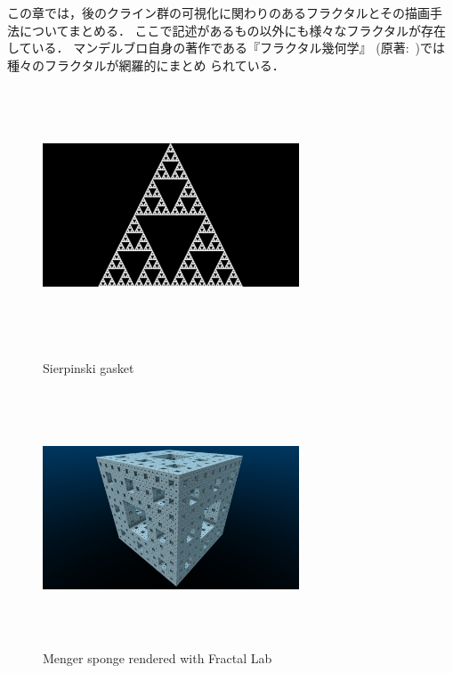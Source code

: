 この章では，後のクライン群の可視化に関わりのあるフラクタルとその描画手
法についてまとめる．
ここで記述があるもの以外にも様々なフラクタルが存在している．
マンデルブロ自身の著作である『フラクタル幾何学』
\cite{mandelbrot-ja-201102-1}
\cite{mandelbrot-ja-201102-2}
(原著:~\cite{mandelbrot1983fractal})では種々のフラクタルが網羅的にまとめ
られている．

\begin{figure}[htbp]
 \begin{minipage}{0.5\hsize}
   \center
  \includegraphics[width=3in, height=3in, keepaspectratio]{../img/fractal/gasket.pdf}
  \caption{Sierpinski gasket}
  \label{fig:gasket}
 \end{minipage}
 \begin{minipage}{0.5\hsize}
  \center
  \includegraphics[width=3in, height=3in, keepaspectratio]{../img/fractal/menger.pdf}
  \caption{Menger sponge rendered with Fractal Lab}
  \label{fig:menger}
 \end{minipage}

\end{figure}

